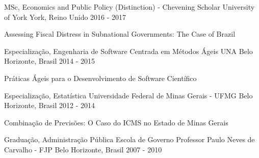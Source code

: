 \begin{cventries}
  \cventry
    {MSc, Economics and Public Policy (Distinction) - Chevening Scholar}
    {University of York}
    {York, Reino Unido}
    {2016 - 2017}
    {
      \begin{cvitems}
        \item {Assessing Fiscal Distress in Subnational Governments: The Case of Brazil}
      \end{cvitems}
    }
  \cventry
    {Especialização, Engenharia de Software Centrada em Métodos Ágeis}
    {UNA}
    {Belo Horizonte, Brasil}
    {2014 - 2015}
    {
      \begin{cvitems}
        \item {Práticas Ágeis para o Desenvolvimento de Software Científico}
      \end{cvitems}
    }
  \cventry
    {Especialização, Estatística}
    {Universidade Federal de Minas Gerais - UFMG}
    {Belo Horizonte, Brasil}
    {2012 - 2014}
    {
      \begin{cvitems}
        \item {Combinação de Previsões: O Caso do ICMS no Estado de Minas Gerais}
      \end{cvitems}
    }
  \cventry
    {Graduação, Administração Pública}
    {Escola de Governo Professor Paulo Neves de Carvalho - FJP}
    {Belo Horizonte, Brasil}
    {2007 - 2010}
    {
      \begin{cvitems}
      \end{cvitems}
    }
\end{cventries}

